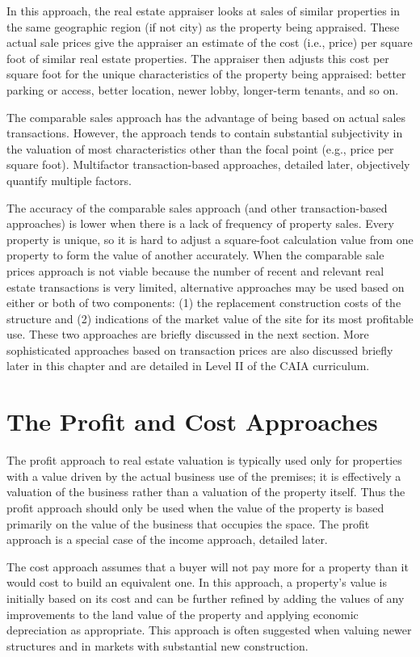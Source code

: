 \documentclass[11pt]{article}
\begin{document}
In this approach, the real estate appraiser looks at sales of similar properties in the same geographic region (if not city) as the property being appraised. These actual sale prices give the appraiser an estimate of the cost (i.e., price) per square foot of similar real estate properties. The appraiser then adjusts this cost per square foot for the unique characteristics of the property being appraised: better parking or access, better location, newer lobby, longer-term tenants, and so on.

The comparable sales approach has the advantage of being based on actual sales transactions. However, the approach tends to contain substantial subjectivity in the valuation of most characteristics other than the focal point (e.g., price per square foot). Multifactor transaction-based approaches, detailed later, objectively quantify multiple factors.

The accuracy of the comparable sales approach (and other transaction-based approaches) is lower when there is a lack of frequency of property sales. Every property is unique, so it is hard to adjust a square-foot calculation value from one property to form the value of another accurately. When the comparable sale prices approach is not viable because the number of recent and relevant real estate transactions is very limited, alternative approaches may be used based on either or both of two components: (1) the replacement construction costs of the structure and (2) indications of the market value of the site for its most profitable use. These two approaches are briefly discussed in the next section. More sophisticated approaches based on transaction prices are also discussed briefly later in this chapter and are detailed in Level II of the CAIA curriculum.

\section*{The Profit and Cost Approaches}
The profit approach to real estate valuation is typically used only for properties with a value driven by the actual business use of the premises; it is effectively a valuation of the business rather than a valuation of the property itself. Thus the profit approach should only be used when the value of the property is based primarily on the value of the business that occupies the space. The profit approach is a special case of the income approach, detailed later.

The cost approach assumes that a buyer will not pay more for a property than it would cost to build an equivalent one. In this approach, a property's value is initially based on its cost and can be further refined by adding the values of any improvements to the land value of the property and applying economic depreciation as appropriate. This approach is often suggested when valuing newer structures and in markets with substantial new construction.
\end{document}
